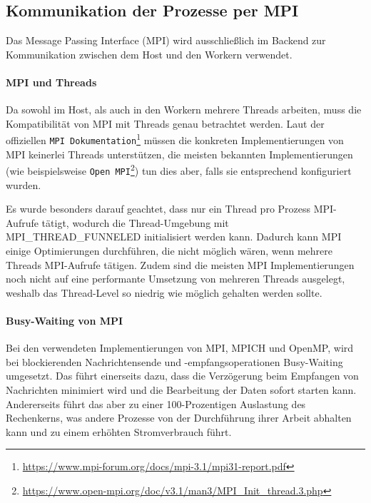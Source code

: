 \subsection{Kommunikation der Prozesse per MPI}\label{sec:mpi}


Das Message Passing Interface (MPI) wird ausschließlich im Backend zur Kommunikation zwischen dem Host und den Workern verwendet.

\paragraph{MPI und Threads}

Da sowohl im Host, als auch in den Workern mehrere Threads arbeiten, muss die Kompatibilität von MPI mit Threads genau betrachtet werden.
Laut der offiziellen \verb|MPI Dokumentation|\footnote{\url{https://www.mpi-forum.org/docs/mpi-3.1/mpi31-report.pdf}} müssen die konkreten Implementierungen von MPI keinerlei Threads unterstützen, die meisten bekannten Implementierungen (wie beispielsweise \verb|Open MPI|\footnote{\url{https://www.open-mpi.org/doc/v3.1/man3/MPI_Init_thread.3.php}}) tun dies aber, falls sie entsprechend konfiguriert wurden.

Es wurde besonders darauf geachtet, dass nur ein Thread pro Prozess MPI-Aufrufe tätigt, wodurch die Thread-Umgebung mit MPI\_THREAD\_FUNNELED initialisiert werden kann.
Dadurch kann MPI einige Optimierungen durchführen, die nicht möglich wären, wenn mehrere Threads MPI-Aufrufe tätigen.
Zudem sind die meisten MPI Implementierungen noch nicht auf eine performante Umsetzung von mehreren Threads ausgelegt, weshalb das Thread-Level so niedrig wie möglich gehalten werden sollte.

\paragraph{Busy-Waiting von MPI}\label{para:mpi_busy_waiting}

Bei den verwendeten Implementierungen von MPI, MPICH und OpenMP, wird bei blockierenden Nachrichtensende und -empfangsoperationen Busy-Waiting umgesetzt.
Das führt einerseits dazu, dass die Verzögerung beim Empfangen von Nachrichten minimiert wird und die Bearbeitung der Daten sofort starten kann.
Andererseits führt das aber zu einer 100-Prozentigen Auslastung des Rechenkerns, was andere Prozesse von der Durchführung ihrer Arbeit abhalten kann und zu einem erhöhten Stromverbrauch führt.

